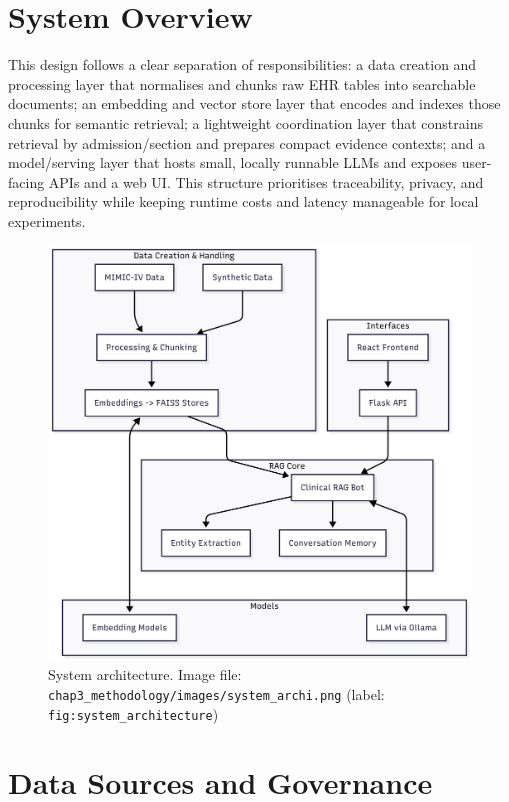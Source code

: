 \section{System Overview}

This design follows a clear separation of responsibilities: a data creation and processing layer that normalises and chunks raw EHR tables into searchable documents; an embedding and vector store layer that encodes and indexes those chunks for semantic retrieval; a lightweight coordination layer that constrains retrieval by admission/section and prepares compact evidence contexts; and a model/serving layer that hosts small, locally runnable LLMs and exposes user-facing APIs and a web UI. This structure prioritises traceability, privacy, and reproducibility while keeping runtime costs and latency manageable for local experiments.
\begin{figure}[H]
  \centering
  \includegraphics[width=0.95\linewidth]{chap3_methodology/images/system_archi.png}
  \caption{System architecture. Image file: \texttt{chap3_methodology/images/system_archi.png} (label: \texttt{fig:system_architecture})}
  \label{fig:system_architecture}
\end{figure}


\section{Data Sources and Governance}


